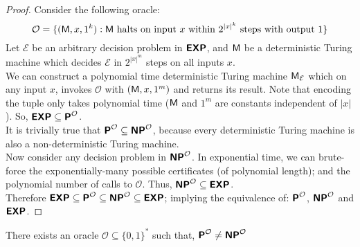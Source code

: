 \documentclass[usletter]{article}
\newcommand{\collection}[1]
           {\ensuremath{\mathcal{#1}}}
\newcommand{\machine}[1]
           {\ensuremath{\textnormal{\textsf{#1}}}}
\newcommand{\family}[1]
           {\ensuremath{\textnormal{\textsf{\textbf{#1}}}}}
\begin{document}
\begin{proof}
Consider the following oracle:
$$ \collection{O} = \{ (\machine{M}, x, 1^k) : \machine{M} \textnormal{ halts on input } x \textnormal{ within } 2^{{|x|}^k} \textnormal{ steps with output } 1 \} $$
Let \collection{E} be an arbitrary decision problem in \family{EXP}, and \machine{M} be a deterministic Turing machine which decides \collection{E} in $2^{{|x|}^m}$ steps on all inputs $x$. \\
We can construct a polynomial time deterministic Turing machine $\machine{M}_\collection{E}$ which on any input $x$, invokes \collection{O} with $(\machine{M}, x, 1^m)$ and returns its result. Note that encoding the tuple only takes polynomial time ($\machine{M}$ and $1^m$ are constants independent of $|x|$).
So, $\family{EXP} \subseteq \family{P}^\collection{O}$. \\

\noindent
It is trivially true that $\family{P}^\collection{O} \subseteq \family{NP}^\collection{O}$, because every deterministic Turing machine is also a non-deterministic Turing machine. \\

\noindent
Now consider any decision problem in $\family{NP}^\collection{O}$. In exponential time, we can brute-force the exponentially-many possible certificates (of polynomial length); and the polynomial number of calls to \collection{O}. Thus, $\family{NP}^\collection{O} \subseteq \family{EXP}$. \\

\noindent
Therefore $\family{EXP} \subseteq \family{P}^\collection{O} \subseteq \family{NP}^\collection{O} \subseteq \family{EXP}$; implying the equivalence of: $\family{P}^\collection{O}$, $\family{NP}^\collection{O}$ and $\family{EXP}$.
\end{proof}

\begin{theorem}
There exists an oracle $\collection{O} \subseteq \{0,1\}^*$ such that, $\family{P}^\collection{O} \neq \family{NP}^\collection{O}$
\end{theorem}
\end{document}
